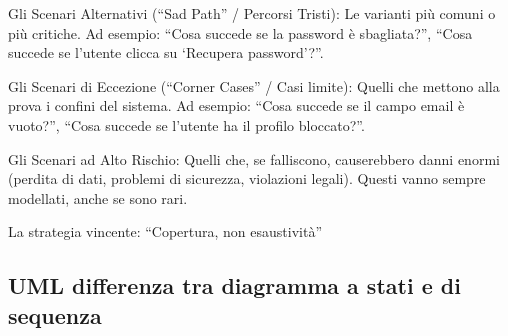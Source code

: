 \documentclass[11pt]{article}
\begin{document}
Gli Scenari Alternativi (``Sad Path'' / Percorsi Tristi): Le varianti più comuni o più critiche. Ad esempio: ``Cosa succede se la password è sbagliata?'', ``Cosa succede se l'utente clicca su `Recupera password'?''.

Gli Scenari di Eccezione (``Corner Cases'' / Casi limite): Quelli che mettono alla prova i confini del sistema. Ad esempio: ``Cosa succede se il campo email è vuoto?'', ``Cosa succede se l'utente ha il profilo bloccato?''.

Gli Scenari ad Alto Rischio: Quelli che, se falliscono, causerebbero danni enormi (perdita di dati, problemi di sicurezza, violazioni legali). Questi vanno sempre modellati, anche se sono rari.

La strategia vincente: ``Copertura, non esaustività''
\subsection{UML differenza tra diagramma a stati e di sequenza}
\label{sec:org9c081db}
\end{document}
